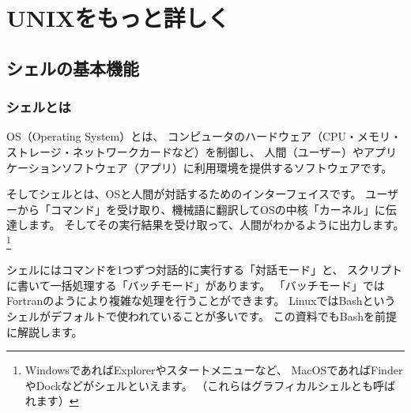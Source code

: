 \documentclass[a4j]{ltjsreport}
\begin{document}
    \chapter{UNIXをもっと詳しく}
    \section{シェルの基本機能}
    \subsection{シェルとは}
    OS（Operating System）とは、
    コンピュータのハードウェア（CPU・メモリ・ストレージ・ネットワークカードなど）を制御し、
    人間（ユーザー）やアプリケーションソフトウェア（アプリ）に利用環境を提供するソフトウェアです。

    そしてシェルとは、OSと人間が対話するためのインターフェイスです。
    ユーザーから「コマンド」を受け取り、機械語に翻訳してOSの中核「カーネル」に伝達します。
    そしてその実行結果を受け取って、人間がわかるように出力します。
    \footnote{WindowsであればExplorerやスタートメニューなど、
    MacOSであればFinderやDockなどがシェルといえます。
    （これらはグラフィカルシェルとも呼ばれます）}

    シェルにはコマンドを1つずつ対話的に実行する「対話モード」と、
    スクリプトに書いて一括処理する「バッチモード」があります。
    「バッチモード」ではFortranのようにより複雑な処理を行うことができます。
    LinuxではBashというシェルがデフォルトで使われていることが多いです。
    この資料でもBashを前提に解説します。
\end{document}
